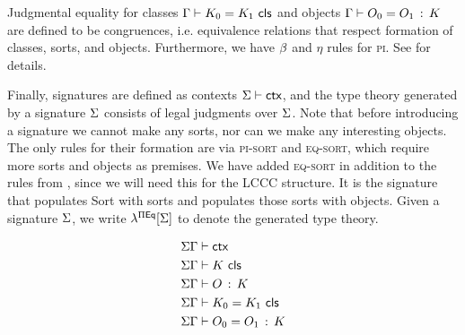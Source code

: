 Judgmental equality for classes $\Gamma \vdash K_{0} = K_{1} \,\, \mathsf{cls}$ and objects
$\Gamma \vdash O_{0} = O_{1} \, : \, K$ are defined to be congruences,
i.e. equivalence relations that respect formation of classes,
sorts, and objects.
Furthermore, we have $\beta$ and $\eta$ rules for \textsc{pi}.
See \cite{harper2021equational} for details. %

Finally, signatures are defined as contexts $\Sigma \vdash \mathsf{ctx}$,
and the type theory generated by a signature $\Sigma$ consists of
legal judgments over $\Sigma$.
Note that before introducing a signature we cannot make any sorts,
nor can we make any interesting objects.
The only rules for their formation are via \textsc{pi-sort} and \textsc{eq-sort},
which require more sorts and objects as premises.
We have added \textsc{eq-sort} in addition to the rules from \cite{harper2021equational},
since we will need this for the LCCC structure.
It is the signature that populates \textsf{Sort} with sorts
and populates those sorts with objects.
Given a signature $\Sigma$, we write $\lambda^{\Pi \mathsf{Eq}}[\Sigma]$ to denote the
generated type theory.

\begin{align*}
  &\Sigma\Gamma \vdash \mathsf{ctx} \\
  &\Sigma\Gamma \vdash K \,\, \mathsf{cls} \\
  &\Sigma\Gamma \vdash O \, : \, K \\
  &\Sigma\Gamma \vdash K_{0} = K_{1} \,\, \mathsf{cls} \\
  &\Sigma\Gamma \vdash O_{0} = O_{1} \, : \, K
\end{align*}
